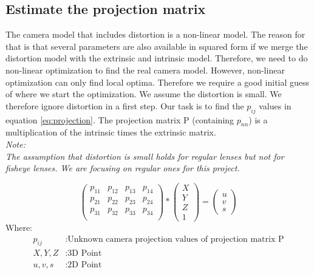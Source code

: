 \documentclass[11pt,a4paper,titlepage,oneside]{report}
\begin{document}
\subsection{Estimate the projection matrix}\label{sec:est_proj}
The camera model that includes distortion is a non-linear model. The reason for that is that several parameters are also available in squared form if we merge the distortion model with the extrinsic and intrinsic model. Therefore, we need to do non-linear optimization to find the real camera model. However, non-linear optimization can only find local optima. Therefore we require a good initial guess of where we start the optimization. We assume the distortion is small. We therefore ignore distortion in a first step. Our task is to find the $p_{ij}$ values in equation \ref{eq:projection}. The projection matrix P (containing $p_{nn}$) is a multiplication of the intrinsic times the extrinsic matrix.\\
\em
Note:\\
The assumption that distortion is small holds for regular lenses but not for fisheye lenses. We are focusing on regular ones for this project.
\normalfont

\begin{equation}\label{eq:projection}
	\begin{pmatrix}p_{11} & p_{12} & p_{13} & p_{14}\\
		p_{21} & p_{22} & p_{23} & p_{24}\\
		p_{31} & p_{32} & p_{33} & p_{34}\\
	\end{pmatrix}*
	\begin{pmatrix}
		X \\
		Y \\
		Z \\
		1
	\end{pmatrix}=
	\begin{pmatrix}
		u \\
		v \\
		s
  \end{pmatrix}
\end{equation}
Where:
\begin{align*}
	p_{ij}		&: \text{Unknown camera projection values of projection matrix P}\\
	X,Y,Z			&: \text{3D Point}\\
	u,v,s			&: \text{2D Point}\\
\end{align*}
\end{document}
